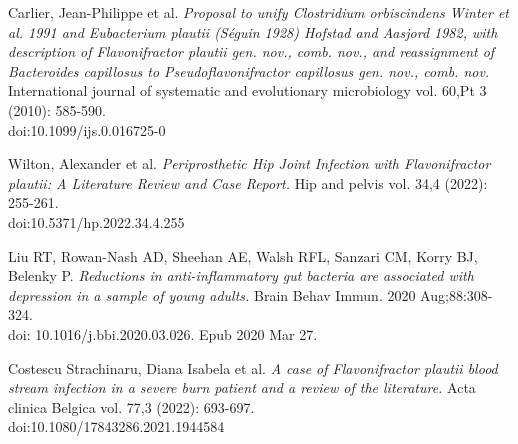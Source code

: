 \documentclass[a4paper,titlepage, oneside]{book}
\begin{document}
\begin{thebibliography}{}
Carlier, Jean-Philippe et al. \emph{Proposal to unify Clostridium orbiscindens Winter et al. 1991 and Eubacterium plautii (Séguin 1928) Hofstad and Aasjord 1982, with description of Flavonifractor plautii gen. nov., comb. nov., and reassignment of Bacteroides capillosus to Pseudoflavonifractor capillosus gen. nov., comb. nov.} International journal of systematic and evolutionary microbiology vol. 60,Pt 3 (2010): 585-590.\\doi:10.1099/ijs.0.016725-0

Wilton, Alexander et al. \emph{Periprosthetic Hip Joint Infection with Flavonifractor plautii: A Literature Review and Case Report.} Hip and pelvis vol. 34,4 (2022): 255-261.\\doi:10.5371/hp.2022.34.4.255

Liu RT, Rowan-Nash AD, Sheehan AE, Walsh RFL, Sanzari CM, Korry BJ, Belenky P. \emph{Reductions in anti-inflammatory gut bacteria are associated with depression in a sample of young adults.} Brain Behav Immun. 2020 Aug;88:308-324.\\doi: 10.1016/j.bbi.2020.03.026. Epub 2020 Mar 27. 

Costescu Strachinaru, Diana Isabela et al. \emph{A case of Flavonifractor plautii blood stream infection in a severe burn patient and a review of the literature.} Acta clinica Belgica vol. 77,3 (2022): 693-697.\\doi:10.1080/17843286.2021.1944584

\end{thebibliography}
\end{document}

